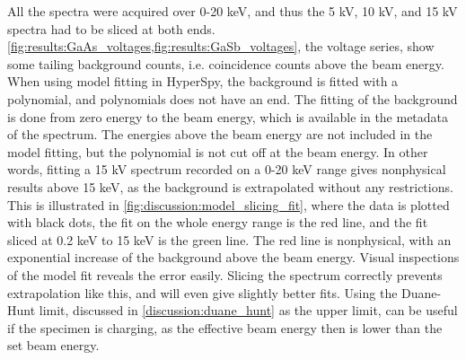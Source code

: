 All the spectra were acquired over 0-20 keV, and thus the 5 kV, 10 kV, and 15 kV spectra had to be sliced at both ends.
\cref{fig:results:GaAs_voltages,fig:results:GaSb_voltages}, the voltage series, show some tailing background counts, i.e. coincidence counts above the beam energy.
When using model fitting in HyperSpy, the background is fitted with a polynomial, and polynomials does not have an end.
The fitting of the background is done from zero energy to the beam energy, which is available in the metadata of the spectrum.
The energies above the beam energy are not included in the model fitting, but the polynomial is not cut off at the beam energy.
In other words, fitting a 15 kV spectrum recorded on a 0-20 keV range gives nonphysical results above 15 keV, as the background is extrapolated without any restrictions.
This is illustrated in \cref{fig:discussion:model_slicing_fit}, where the data is plotted with black dots, the fit on the whole energy range is the red line, and the fit sliced at 0.2 keV to 15 keV is the green line.
The red line is nonphysical, with an exponential increase of the background above the beam energy.
Visual inspections of the model fit reveals the error easily.
Slicing the spectrum correctly prevents extrapolation like this, and will even give slightly better fits.
Using the Duane-Hunt limit, discussed in \cref{discussion:duane_hunt} as the upper limit, can be useful if the specimen is charging, as the effective beam energy then is lower than the set beam energy.


